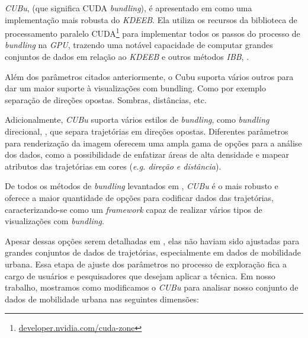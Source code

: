 \emph{CUBu}, (que significa CUDA \emph{bundling}), é apresentado em
\citet{zwan:16} como uma implementação mais robusta do \emph{KDEEB}. Ela
utiliza os recursos da biblioteca de processamento paralelo
CUDA\footnote{\url{developer.nvidia.com/cuda-zone}} para implementar todos os
passos do processo de \emph{bundling} na \emph{GPU}, trazendo uma notável
capacidade de computar grandes conjuntos de dados em relação ao \emph{KDEEB}
e outros métodos \emph{IBB}, \citep{adeb,lhuillier-fft:17}.

Além dos parâmetros citados anteriormente, o Cubu suporta vários
outros para dar um maior suporte à visualizações com bundling. Como por
exemplo separação de direções opostas. Sombras, distâncias, etc.

Adicionalmente, \emph{CUBu} suporta vários estilos de \emph{bundling},
como \emph{bundling} direcional, \citep{adeb}, que separa trajetórias
em direções opostas. Diferentes parâmetros para renderização da imagem oferecem
uma ampla gama de opções para a análise dos dados, como a possibilidade de
enfatizar áreas de alta densidade e mapear atributos das trajetórias
em cores (\emph{e.g. direção e distância}).
 
De todos os métodos de \emph{bundling} levantados em \citet{Lhuillier2017},
\emph{CUBu} é o mais robusto e oferece a maior quantidade de opções para codificar
dados das trajetórias, caracterizando-se como um \emph{framework} capaz de realizar
vários tipos de visualizações com \emph{bundling}.


Apesar dessas opções serem detalhadas em \citet{zwan:16}, elas não haviam sido
ajustadas para grandes conjuntos de dados de trajetórias, especialmente em dados
de mobilidade urbana. Essa etapa de ajuste dos parâmetros no processo de
exploração fica a cargo de usuários e pesquisadores que desejam aplicar a
técnica. Em nosso trabalho, mostramos como modificamos o \emph{CUBu} para
analisar nosso conjunto de dados de mobilidade urbana nas seguintes dimensões:

